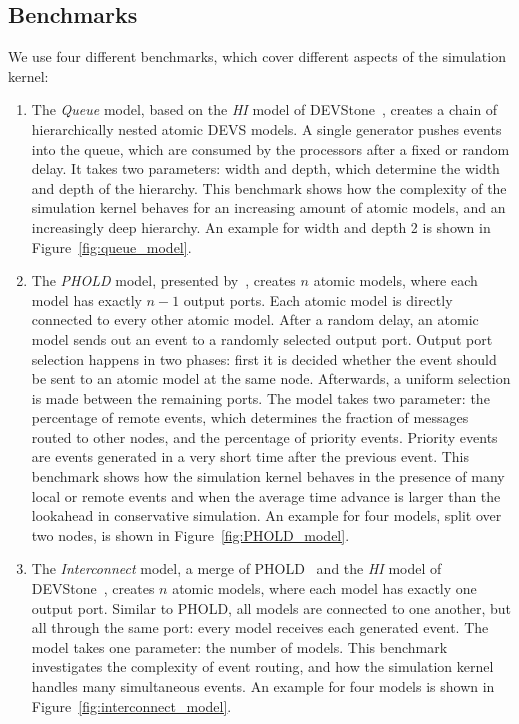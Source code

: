 \subsection{Benchmarks}
We use four different benchmarks, which cover different aspects of the simulation kernel:
\begin{enumerate}
	\item The \textit{Queue} model, based on the \textit{HI} model of DEVStone~\cite{DEVStone}, creates a chain of hierarchically nested atomic \textsf{DEVS} models.
	A single generator pushes events into the queue, which are consumed by the processors after a fixed or random delay.
	It takes two parameters: width and depth, which determine the width and depth of the hierarchy.
	This benchmark shows how the complexity of the simulation kernel behaves for an increasing amount of atomic models, and an increasingly deep hierarchy.
	An example for width and depth 2 is shown in Figure~\ref{fig:queue_model}.
	
	\item The \textit{PHOLD} model, presented by~\cite{PHOLD}, creates $n$ atomic models, where each model has exactly $n-1$ output ports.
	Each atomic model is directly connected to every other atomic model.
	After a random delay, an atomic model sends out an event to a randomly selected output port.
	Output port selection happens in two phases: first it is decided whether the event should be sent to an atomic model at the same node.
	Afterwards, a uniform selection is made between the remaining ports.
	The model takes two parameter: the percentage of remote events, which determines the fraction of messages routed to other nodes, and the percentage of priority events. Priority events are events generated in a very short time after the previous event.
	This benchmark shows how the simulation kernel behaves in the presence of many local or remote events and when the average time advance is larger than the lookahead in conservative simulation.
	An example for four models, split over two nodes, is shown in Figure~\ref{fig:PHOLD_model}.
	
	\item The \textit{Interconnect} model, a merge of PHOLD~\cite{PHOLD} and the \textit{HI} model of DEVStone~\cite{DEVStone}, creates $n$ atomic models, where each model has exactly one output port.
	Similar to PHOLD, all models are connected to one another, but all through the same port: every model receives each generated event.
	The model takes one parameter: the number of models.
	This benchmark investigates the complexity of event routing, and how the simulation kernel handles many simultaneous events.
	An example for four models is shown in Figure~\ref{fig:interconnect_model}.
\end{enumerate}

